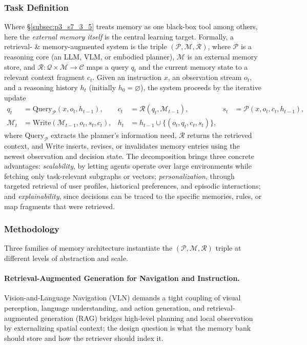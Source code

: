 \subsubsection{Task Definition}
Where §\ref{subsec:p3_s7_3_5} treats memory as one black-box tool among others, here the \emph{external memory itself} is the central learning target. Formally, a retrieval- \& memory-augmented system is the triple $(\mathcal{P}, \mathcal{M}, \mathcal{R})$, where $\mathcal{P}$ is a reasoning core (an LLM, VLM, or embodied planner), $\mathcal{M}$ is an external memory store, and $\mathcal{R}: \mathcal{Q} \times \mathcal{M} \to \mathcal{C}$ maps a query $q_t$ and the current memory state to a relevant context fragment $c_t$. Given an instruction $x$, an observation stream $o_t$, and a reasoning history $h_t$ (initially $h_0 = \varnothing$), the system proceeds by the iterative update
\begin{equation}
\begin{aligned}
q_t &= \mathrm{Query}_{\mathcal{P}}(x, o_t, h_{t-1}), &
c_t &= \mathcal{R}(q_t, \mathcal{M}_{t-1}), &
s_t &= \mathcal{P}(x, o_t, c_t, h_{t-1}), \\
\mathcal{M}_t &= \mathrm{Write}(\mathcal{M}_{t-1}, o_t, s_t, c_t), &
h_t &= h_{t-1} \cup \{(o_t, q_t, c_t, s_t)\},
\end{aligned}
\end{equation}
where $\mathrm{Query}_{\mathcal{P}}$ extracts the planner's information need, $\mathcal{R}$ returns the retrieved context, and $\mathrm{Write}$ inserts, revises, or invalidates memory entries using the newest observation and decision state. The decomposition brings three concrete advantages: \emph{scalability}, by letting agents operate over large environments while fetching only task-relevant subgraphs or vectors; \emph{personalization}, through targeted retrieval of user profiles, historical preferences, and episodic interactions; and \emph{explainability}, since decisions can be traced to the specific memories, rules, or map fragments that were retrieved.

\subsubsection{Methodology}
Three families of memory architecture instantiate the $(\mathcal{P}, \mathcal{M}, \mathcal{R})$ triple at different levels of abstraction and scale.

\paragraph{Retrieval-Augmented Generation for Navigation and Instruction.}
Vision-and-Language Navigation (VLN) demands a tight coupling of visual perception, language understanding, and action generation, and retrieval-augmented generation (RAG) bridges high-level planning and local observation by externalizing spatial context; the design question is what the memory bank should store and how the retriever should index it.

